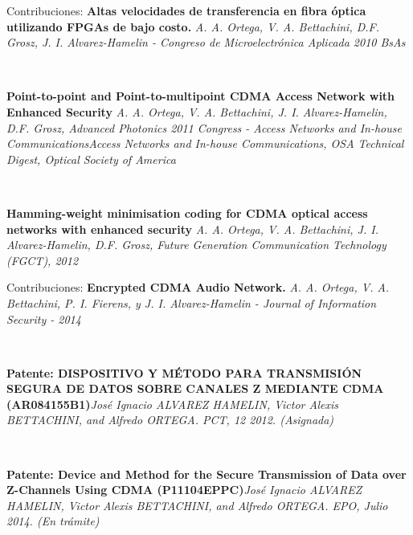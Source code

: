 \documentclass[aspectratio=169]{beamer}
\begin{document}


\begin{frame}{Contribuciones:}
\textbf{Altas velocidades de transferencia en fibra óptica utilizando FPGAs de bajo costo. } \textit{A. A. Ortega, V. A. Bettachini, D.F. Grosz, J. I. Alvarez-Hamelin - Congreso de Microelectrónica Aplicada 2010 BsAs}

\

\textbf{ Point-to-point and Point-to-multipoint CDMA Access Network with Enhanced Security} \textit{ A. A. Ortega, V. A. Bettachini, J. I. Alvarez-Hamelin,  D.F. Grosz, Advanced Photonics 2011 Congress - Access Networks and In-house CommunicationsAccess Networks and In-house Communications, OSA Technical Digest, Optical Society of America}

\

\textbf{Hamming-weight minimisation coding for CDMA optical access networks with enhanced security} \textit{ A. A. Ortega, V. A. Bettachini, J. I. Alvarez-Hamelin, D.F. Grosz, Future Generation Communication Technology (FGCT), 2012}


\end{frame}

\begin{frame}{Contribuciones:}
\textbf{Encrypted CDMA Audio Network.} \textit{ A. A. Ortega, V. A. Bettachini, P. I. Fierens, y J. I. Alvarez-Hamelin -  Journal of Information Security - 2014}

\

\textbf{Patente: DISPOSITIVO Y MÉTODO PARA TRANSMISIÓN SEGURA DE DATOS SOBRE CANALES Z MEDIANTE CDMA (AR084155B1)}\textit{José Ignacio ALVAREZ HAMELIN, Victor Alexis BETTACHINI, and Alfredo ORTEGA. PCT, 12 2012. (Asignada)}

\

\textbf{Patente: Device and Method for the Secure Transmission of Data over Z-Channels Using CDMA (P11104EPPC)}\textit{José Ignacio ALVAREZ HAMELIN, Victor Alexis BETTACHINI, and Alfredo ORTEGA. EPO, Julio 2014. (En trámite)}

\
\end{frame}
\end{document}
